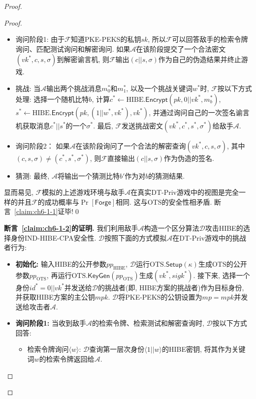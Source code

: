 \begin{proof}
\begin{proof}
\begin{trivlist}
\begin{itemize}
\item 询问阶段1: 由于$\mathcal{F}$知道PKE-PEKS的私钥$sk$, 所以$\mathcal{F}$可以回答敌手的检索令牌询问、匹配测试询问和解密询问. 如果$\mathcal{A}$在该阶段提交了一个合法密文$(vk^*, c, s, \sigma)$到解密谕言机, 则$\mathcal{F}$输出$(c||s, \sigma)$作为自己的伪造结果并终止游戏. 

\item 挑战: 当$\mathcal{A}$输出两个挑战消息$m_0^*$和$m_1^*$, 以及一个挑战关键词$w^*$时, $\mathcal{F}$按以下方式处理: 选择一个随机比特$b$, 计算$c^* \leftarrow \text{HIBE}.\mathsf{Encrypt}(pk, 0||vk^*, m_b^*)$, 
$s^* \leftarrow \text{HIBE}.\mathsf{Encrypt}(pk, (1||w^*, vk^*), vk^*)$, 并通过询问自己的一次签名谕言机获取消息$c^*||s^*$的一个$\sigma^*$. 最后, $\mathcal{F}$发送挑战密文$(vk^*, c^*, s^*, \sigma^*)$给敌手$\mathcal{A}$. 

\item 询问阶段2： 如果$\mathcal{A}$在该阶段询问了一个合法的解密查询$(vk^*, c, s, \sigma)$, 其中$(c, s, \sigma) \neq (c^*, s^*, \sigma^*)$, 则$\mathcal{F}$直接输出$(c||s, \sigma)$作为伪造的签名. 

\item 猜测: 最终, $\mathcal{A}$将输出一个猜测比特$b'$作为对$b$的猜测结果.
\end{itemize}

显而易见, $\mathcal{F}$模拟的上述游戏环境与敌手$\mathcal{A}$在真实DT-Priv游戏中的视图是完全一样的并且$\mathcal{F}$的成功概率与$\Pr[\mathsf{Forge}]$相同. 这与OTS的安全性相矛盾. 断言~\ref{claim:ch6-1-1}证毕!\qed 
\end{trivlist}

\begin{trivlist} \itemsep 1pt \parskip 0pt \parsep 0pt
	\item \textbf{断言~\ref{claim:ch6-1-2}的证明.} 我们利用敌手$\mathcal{A}$构造一个区分算法$\mathcal{D}$攻击HIBE的选择身份IND-HIBE-CPA安全性. $\mathcal{D}$按照下面的方式模拟$\mathcal{A}$在DT-Priv游戏中的挑战者行为:
\begin{itemize}
	\item \textbf{初始化:} 输入HIBE的公开参数$pp_{\text{HIBE}}$, $\mathcal{D}$运行$\text{OTS}.\mathsf{Setup}(\kappa)$生成OTS的公开参数$pp_{\text{OTS}}$, 再运行$\text{OTS}.\mathsf{KeyGen}(pp_{\text{OTS}})$生成$(vk^*, sigk^*)$. 接下来, 选择一个身份$id^* = 0||vk^*$并发送给$\mathcal{D}$的挑战者(即, HIBE方案的挑战者)作为目标身份, 并获取HIBE方案的主公钥$mpk$. $\mathcal{D}$将PKE-PEKS的公钥设置为$mp = mpk$并发送给攻击者$\mathcal{A}$.

	\item \textbf{询问阶段1:} 当收到敌手$\mathcal{A}$的检索令牌、检索测试和解密查询时, $\mathcal{D}$按以下方式回答:\vspace{-0.5em}
		\begin{itemize} \itemsep 1pt \parskip 0pt \parsep 0pt
			\item 检索令牌询问$\langle w \rangle$: $\mathcal{D}$查询第一层次身份$\langle 1||w \rangle$的HIBE密钥, 将其作为关键词$w$的检索令牌返回给$\mathcal{A}$.


\end{itemize}
\end{itemize}
\end{trivlist}
\end{proof}
\end{proof}
